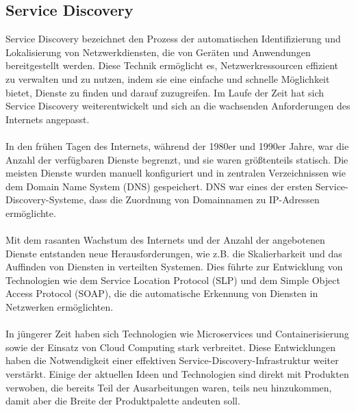 \subsection{Service Discovery}

Service Discovery bezeichnet den Prozess der automatischen Identifizierung und Lokalisierung von Netzwerkdiensten, die von Geräten und Anwendungen bereitgestellt werden. Diese Technik ermöglicht es, Netzwerkressourcen effizient zu verwalten und zu nutzen, indem sie eine einfache und schnelle Möglichkeit bietet, Dienste zu finden und darauf zuzugreifen. Im Laufe der Zeit hat sich Service Discovery weiterentwickelt und sich an die wachsenden Anforderungen des Internets angepasst.
\\\\
In den frühen Tagen des Internets, während der 1980er und 1990er Jahre, war die Anzahl der verfügbaren Dienste begrenzt, und sie waren größtenteils statisch. Die meisten Dienste wurden manuell konfiguriert und in zentralen Verzeichnissen wie dem Domain Name System (DNS) gespeichert. DNS war eines der ersten Service-Discovery-Systeme, dass die Zuordnung von Domainnamen zu IP-Adressen ermöglichte.
\\\\
Mit dem rasanten Wachstum des Internets und der Anzahl der angebotenen Dienste entstanden neue Herausforderungen, wie z.B. die Skalierbarkeit und das Auffinden von Diensten in verteilten Systemen. Dies führte zur Entwicklung von Technologien wie dem Service Location Protocol (SLP) und dem Simple Object Access Protocol (SOAP), die die automatische Erkennung von Diensten in Netzwerken ermöglichten.
\\\\
In jüngerer Zeit haben sich Technologien wie Microservices und Containerisierung sowie der Einsatz von Cloud Computing stark verbreitet. Diese Entwicklungen haben die Notwendigkeit einer effektiven Service-Discovery-Infrastruktur weiter verstärkt. Einige der aktuellen Ideen und Technologien sind direkt mit Produkten verwoben, die bereits Teil der Ausarbeitungen waren, teils neu hinzukommen, damit aber die Breite der Produktpalette andeuten soll.
